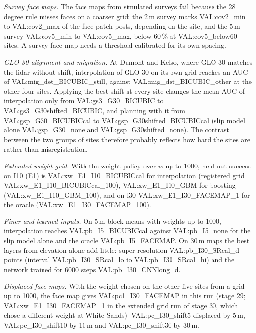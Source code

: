 \textit{Survey face maps.} The face maps from simulated surveys fail because the 28\,degree rule misses faces on a coarser grid: the 2\,m survey marks {{VAL:cov2_min}} to {{VAL:cov2_max}} of the face patch posts, depending on the site, and the 5\,m survey {{VAL:cov5_min}} to {{VAL:cov5_max}}, below 60\,\% at {{VAL:cov5_below60}} sites. A survey face map needs a threshold calibrated for its own spacing.

\textit{GLO-30 alignment and migration.} At Dumont and Kelso, where GLO-30 matches the lidar without shift, interpolation of GLO-30 on its own grid reaches an AUC of {{VAL:mig_det_BICUBIC_still}}, against {{VAL:mig_det_BICUBIC_other}} at the other four sites. Applying the best shift at every site changes the mean AUC of interpolation only from {{VAL:gs3_G30_BICUBIC}} to {{VAL:gs3_G30shifted_BICUBIC}}, and planning with it from {{VAL:gsp_G30_BICUBICcal}} to {{VAL:gsp_G30shifted_BICUBICcal}} (slip model alone {{VAL:gsp_G30_none}} and {{VAL:gsp_G30shifted_none}}). The contrast between the two groups of sites therefore probably reflects how hard the sites are rather than misregistration.

\textit{Extended weight grid.} With the weight policy over $w$ up to 1000, held out success on I10 (E1) is {{VAL:xw_E1_I10_BICUBICcal}} for interpolation (registered grid {{VAL:xw_E1_I10_BICUBICcal_100}}), {{VAL:xw_E1_I10_GBM}} for boosting ({{VAL:xw_E1_I10_GBM_100}}), and on I30 {{VAL:xw_E1_I30_FACEMAP_1}} for the oracle ({{VAL:xw_E1_I30_FACEMAP_100}}).

\textit{Finer and learned inputs.} On 5\,m block means with weights up to 1000, interpolation reaches {{VAL:pb_I5_BICUBICcal}} against {{VAL:pb_I5_none}} for the slip model alone and the oracle {{VAL:pb_I5_FACEMAP}}. On 30\,m maps the best layers from elevation alone add little: super resolution {{VAL:pb_I30_SRcal_d}} points (interval {{VAL:pb_I30_SRcal_lo}} to {{VAL:pb_I30_SRcal_hi}}) and the network trained for 6000 steps {{VAL:pb_I30_CNNlong_d}}.

\textit{Displaced face maps.} With the weight chosen on the other five sites from a grid up to 1000, the face map gives {{VAL:pc1_I30_FACEMAP}} in this run (stage 29; {{VAL:xw_E1_I30_FACEMAP_1}} in the extended grid run of stage 30, which chose a different weight at White Sands), {{VAL:pc_I30_shift5}} displaced by 5\,m, {{VAL:pc_I30_shift10}} by 10\,m and {{VAL:pc_I30_shift30}} by 30\,m.
